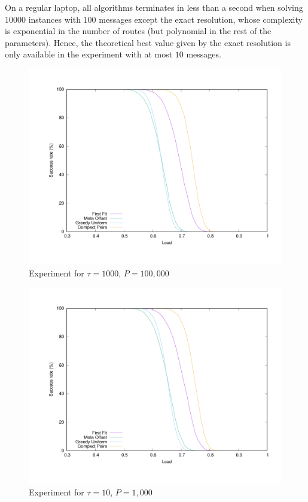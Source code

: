 \documentclass[a4paper,UKenglish,cleveref, autoref, thm-restate]{lipics-v2019}
\begin{document}
On a regular laptop, all algorithms terminates in less than a second when solving $10000$ instances with $100$ messages except the exact resolution, whose complexity is exponential in the number of routes (but polynomial in the rest of the parameters). Hence, the theoretical best value given by the exact resolution is only available in the experiment with at most $10$ messages. 
\begin{figure}
\begin{center}
\includegraphics[scale=0.3]{100messBig}
\end{center}
\caption{Experiment for $\tau = 1000$, $P=100,000$}
\label{fig:100messBig}
\end{figure}

\begin{figure}
\begin{center}
\includegraphics[scale=0.3]{100messSmall}
\end{center}
\caption{Experiment for $\tau = 10$, $P=1,000$}
\label{fig:100messSmall}
\end{figure}
\end{document}
